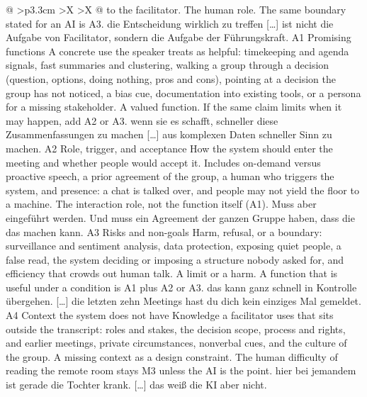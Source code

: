 \begin{xltabular}{\textwidth}{@{}
    >{\RaggedRight\arraybackslash}p{3.3cm}
    >{\RaggedRight\arraybackslash}X
    >{\RaggedRight\arraybackslash}X
  @{}}
{  to the facilitator.}
  {The human role. The same boundary stated for an AI is A3.}
  {die Entscheidung wirklich zu treffen [\ldots] ist nicht die Aufgabe von Facilitator,
  sondern die Aufgabe der Führungskraft.}
  \cbcatbreak
  \cbrow
  {A1}
  {Promising functions}
  {A concrete use the speaker treats as helpful: timekeeping and agenda signals, fast
    summaries and clustering, walking a group through a decision (question, options, doing
    nothing, pros and cons), pointing at a decision the group has not noticed, a bias cue,
  documentation into existing tools, or a persona for a missing stakeholder.}
  {A valued function. If the same claim limits when it may happen, add A2 or A3.}
  {wenn sie es schafft, schneller diese Zusammenfassungen zu machen [\ldots] aus komplexen
  Daten schneller Sinn zu machen.}
  \cbgap
  \cbrow
  {A2}
  {Role, trigger, and acceptance}
  {How the system should enter the meeting and whether people would accept it. Includes
    on-demand versus proactive speech, a prior agreement of the group, a human who triggers
    the system, and presence: a chat is talked over, and people may not yield the floor to a
  machine.}
  {The interaction role, not the function itself (A1).}
  {Muss aber eingeführt werden. Und muss ein Agreement der ganzen Gruppe haben, dass die das
  machen kann.}
  \cbgap
  \cbrow
  {A3}
  {Risks and non-goals}
  {Harm, refusal, or a boundary: surveillance and sentiment analysis, data protection,
    exposing quiet people, a false read, the system deciding or imposing a structure nobody
  asked for, and efficiency that crowds out human talk.}
  {A limit or a harm. A function that is useful under a condition is A1 plus A2 or A3.}
  {das kann ganz schnell in Kontrolle übergehen. [\ldots] die letzten zehn Meetings hast du
  dich kein einziges Mal gemeldet.}
  \cbgap
  \cbrow
  {A4}
  {Context the system does not have}
  {Knowledge a facilitator uses that sits outside the transcript: roles and stakes, the
    decision scope, process and rights, and earlier meetings, private circumstances, nonverbal cues, and the culture of
  the group.}
  {A missing context as a design constraint. The human difficulty of reading the remote room
  stays M3 unless the AI is the point.}
  {hier bei jemandem ist gerade die Tochter krank. [\ldots] das weiß die KI aber nicht.}
\end{xltabular}
\endgroup
